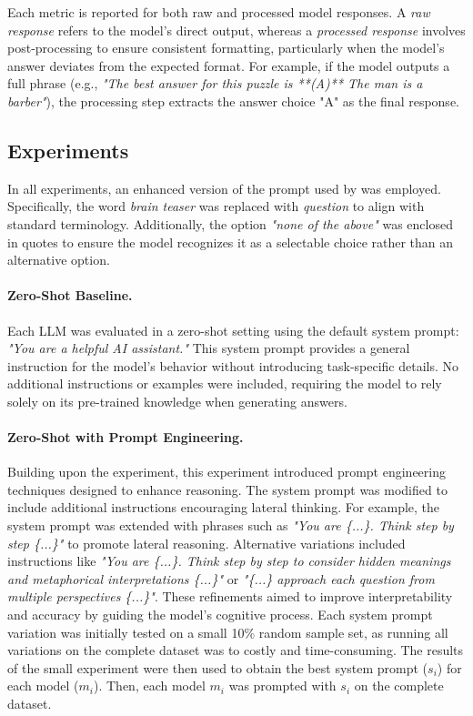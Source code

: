 Each metric is reported for both raw and processed model responses. A \textit{raw response} refers to the model's direct output, whereas a \textit{processed response} involves post-processing to ensure consistent formatting, particularly when the model's answer deviates from the expected format. For example, if the model outputs a full phrase (e.g., \textit{"The best answer for this puzzle is **(A)** The man is a barber"}), the processing step extracts the answer choice "A" as the final response.

\subsection{Experiments}

In all experiments, an enhanced version of the prompt used by \textcite{jiangBRAINTEASERLateralThinking2023} was employed. Specifically, the word \textit{brain teaser} was replaced with \textit{question} to align with standard terminology. Additionally, the option \textit{"none of the above"} was enclosed in quotes to ensure the model recognizes it as a selectable choice rather than an alternative option.

\paragraph{Zero-Shot Baseline.}
\label{zero-shot-prompt}
Each \ac{LLM} was evaluated in a zero-shot setting using the default system prompt: \textit{"You are a helpful AI assistant."} This system prompt provides a general instruction for the model's behavior without introducing task-specific details. No additional instructions or examples were included, requiring the model to rely solely on its pre-trained knowledge when generating answers.

\paragraph{Zero-Shot with Prompt Engineering.}
\label{zero-shot-prompt-engineering}
Building upon the  experiment, this experiment introduced prompt engineering techniques designed to enhance reasoning. The system prompt was modified to include additional instructions encouraging lateral thinking. For example, the system prompt was extended with phrases such as \textit{"You are \{...\}. Think step by step \{...\}"} to promote lateral reasoning. Alternative variations included instructions like \textit{"You are \{...\}. Think step by step to consider hidden meanings and metaphorical interpretations \{...\}"} or \textit{"\{...\} approach each question from multiple perspectives \{...\}"}. These refinements aimed to improve interpretability and accuracy by guiding the model's cognitive process. Each system prompt variation was initially tested on a small 10\% random sample set, as running all variations on the complete dataset was to costly and time-consuming. The results of the small experiment were then used to obtain the best system prompt ($s_i$) for each model ($m_i$). Then, each model $m_i$ was prompted with $s_i$ on the complete dataset.

